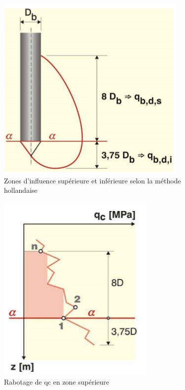             \begin{multicols}{3}
            
                \begin{figure}[h!]
                \center
                \includegraphics[scale=0.6]{Holeyman/images/H40.PNG}
                \caption{Zones d’influence supérieure et inférieure selon la méthode hollandaise}
                \end{figure}
            
            \vfill\null\columnbreak
            
                \begin{figure}[h!]
                \includegraphics[scale=0.6]{Holeyman/images/H41.PNG}
                \caption{Rabotage de qc en zone supérieure }
                \end{figure}
                

\end{multicols}
